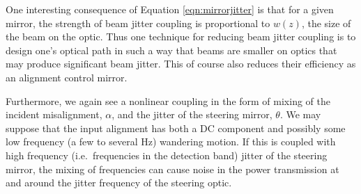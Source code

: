 One interesting consequence of Equation \ref{eqn:mirrorjitter} is that for a given mirror, the strength of beam jitter coupling is proportional to $w(z)$, the size of the beam on the optic. %
Thus one technique for reducing beam jitter coupling is to design one's optical path in such a way that beams are smaller on optics that may produce significant beam jitter. %
This of course also reduces their efficiency as an alignment control mirror.

Furthermore, we again see a nonlinear coupling in the form of mixing of the incident misalignment, $\alpha$, and the jitter of the steering mirror, $\theta$. %
We may suppose that the input alignment has both a DC component and possibly some low frequency (a few to several Hz) wandering motion. %
If this is coupled with high frequency (i.e.\ frequencies in the detection band) jitter of the steering mirror, the mixing of frequencies can cause noise in the power transmission at and around the jitter frequency of the steering optic.


